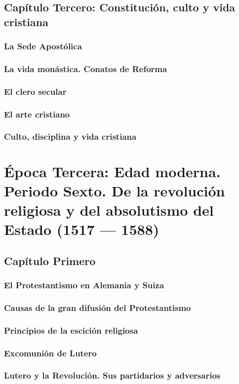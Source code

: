 \raggedbottom{} \documentclass[12pt, a4paper, openany]{book} %
\begin{document}
\chapter{Capítulo Tercero: Constitución, culto y vida cristiana}
\section{La Sede Apostólica}
\section{La vida monástica. Conatos de Reforma}
\section{El clero secular}
\section{El arte cristiano}
\section{Culto, disciplina y vida cristiana}
\part{Época Tercera: Edad moderna. Periodo Sexto. De la revolución religiosa y del absolutismo del Estado (1517 --- 1588)}
\chapter{Capítulo Primero}
\section{El Protestantismo en Alemania y Suiza}
\section{Causas de la gran difusión del Protestantismo}
\section{Principios de la escición religiosa}
\section{Excomunión de Lutero}
\section{Lutero y la Revolución. Sus partidarios y adversarios}
\end{document}
